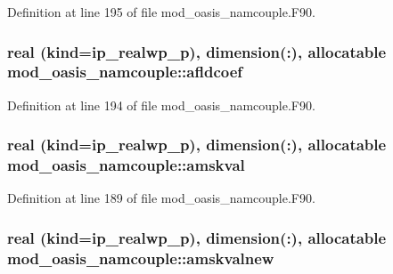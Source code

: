 Definition at line 195 of file mod\+\_\+oasis\+\_\+namcouple.\+F90.

\hypertarget{classmod__oasis__namcouple_a19fb86d643bb8761d5a8e32d645d5963}{
\subsubsection[{afldcoef}]{\setlength{\rightskip}{0pt plus 5cm}real (kind=ip\+\_\+realwp\+\_\+p), dimension(\+:), allocatable mod\+\_\+oasis\+\_\+namcouple\+::afldcoef\hspace{0.3cm}{\ttfamily [private]}}}\label{classmod__oasis__namcouple_a19fb86d643bb8761d5a8e32d645d5963}


Definition at line 194 of file mod\+\_\+oasis\+\_\+namcouple.\+F90.

\hypertarget{classmod__oasis__namcouple_a92d43fa5eaaff81f0e3f73b303377c02}{
\subsubsection[{amskval}]{\setlength{\rightskip}{0pt plus 5cm}real (kind=ip\+\_\+realwp\+\_\+p), dimension(\+:), allocatable mod\+\_\+oasis\+\_\+namcouple\+::amskval\hspace{0.3cm}{\ttfamily [private]}}}\label{classmod__oasis__namcouple_a92d43fa5eaaff81f0e3f73b303377c02}


Definition at line 189 of file mod\+\_\+oasis\+\_\+namcouple.\+F90.

\hypertarget{classmod__oasis__namcouple_a3598202174da65117caf675065f8b160}{
\subsubsection[{amskvalnew}]{\setlength{\rightskip}{0pt plus 5cm}real (kind=ip\+\_\+realwp\+\_\+p), dimension(\+:), allocatable mod\+\_\+oasis\+\_\+namcouple\+::amskvalnew\hspace{0.3cm}{\ttfamily [private]}}}\label{classmod__oasis__namcouple_a3598202174da65117caf675065f8b160}


